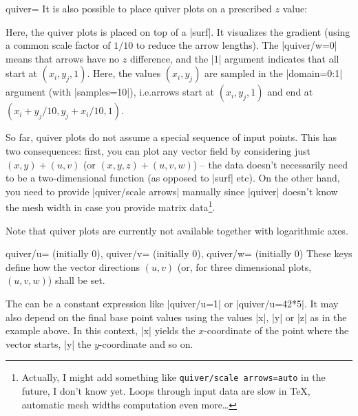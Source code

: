 {\begin{plottype}[/pgfplots]{quiver=%
    \textcolor{black}{}%
}
    It is also possible to place quiver plots on a prescribed $z$ value:
\pgfplotsexpensiveexample
\begin{codeexample}[]
\end{codeexample}
    \noindent Here, the quiver plots is placed on top of a |surf|. It
    visualizes the gradient (using a common scale factor of $1/10$ to reduce
    the arrow lengths). The |quiver/w=0| means that arrows have no $z$
    difference, and the |{1}| argument indicates that all start at
    $(x_i,y_j,1)$. Here, the values $(x_i,y_j)$ are sampled in the |domain=0:1|
    argument (with |samples=10|), i.e.\@ arrows start at $(x_i,y_j,1)$ and end
    at $(x_i+y_j/10, y_j+x_i/10, 1)$.

    So far, quiver plots do not assume a special sequence of input points. This
    has two consequences: first, you can plot any vector field by considering
    just $(x,y) + (u,v)$ (or $(x,y,z) + (u,v,w)$) -- the data doesn't
    necessarily need to be a two-dimensional function (as opposed to |surf|
    etc). On the other hand, you need to provide |quiver/scale arrows| manually
    since |quiver| doesn't know the mesh width in case you provide matrix
    data\footnote{Actually, I might add something like \texttt{quiver/scale
    arrows=auto} in the future, I don't know yet. Loops through input data are
    slow in \TeX{}, automatic mesh widths computation even more\ldots}.

    Note that quiver plots are currently not available together with
    logarithmic axes.

    \begin{pgfplotskeylist}{%
        quiver/u= (initially 0),
        quiver/v= (initially 0),
        quiver/w= (initially 0)%
    }
        These keys define how the vector directions $(u,v)$ (or, for three
        dimensional plots, $(u,v,w)$) shall be set.

        The  can be a constant expression like |quiver/u=1| or
        |quiver/u=42*5|. It may also depend on the final base point values
        using the values |x|, |y| or |z| as in the example above. In this
        context, |x| yields the $x$-coordinate of the point where the vector
        starts, |y| the $y$-coordinate and so on.



\end{pgfplotskeylist}
\end{plottype}}
